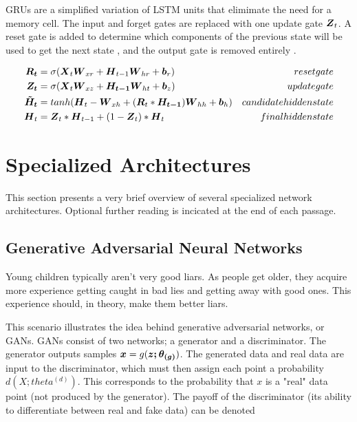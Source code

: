 \documentclass{article}
\begin{document}
GRUs are a simplified variation of LSTM units that elimimate the need for a memory cell. The input and forget gates are replaced with one update gate \(\vb*{Z}_t\). A reset gate is added to determine which components of the previous state will be used to get the next state \cite{hands-on-ml}, and the output gate is removed entirely \cite{pml1book}.

\begin{align*}
    \vb*{R_t} &= \sigma(\vb*{X}_t\vb*{W}_{xr} + \vb*{H}_{t-1}\vb*{W}_{hr} + \vb*{b}_r) & reset gate \\
    \vb*{Z_t} &= \sigma(\vb*{X}_t\vb*{W}_{xz} + \vb*{H_{t-1}}\vb*{W}_{ht} + \vb*{b}_z) & update gate \\
    \vb*{\tilde{H}_t} &= tanh(\vb*{H}_t - \vb*{W}_{xh} + (\vb*{R}_t * \vb*{H_{t-1}})\vb*{W}_{hh} + \vb*{b}_h) & candidate hidden state \\
    \vb*{H}_t &= \vb*{Z}_t * \vb*{H}_{t-1} + (1 - \vb*{Z}_t)*\vb*{H}_t & final hidden state \\
\end{align*}

\section{Specialized Architectures}

This section presents a very brief overview of several specialized network architectures. Optional further reading is incicated at the end of each passage.

\subsection{Generative Adversarial Neural Networks} %

Young children typically aren't very good liars. As people get older, they acquire more experience getting caught in bad lies and getting away with good ones. This experience should, in theory, make them better liars.

This scenario illustrates the idea behind generative adversarial networks, or GANs. GANs consist of two networks; a generator and a discriminator. The generator outputs samples \(\vb*{x} = g(\vb*{z; \theta_{(g)}})\). The generated data and real data are input to the discriminator, which must then assign each point a probability \(d(X; theta^{(d)})\). This corresponds to the probability that \(x\) is a "real" data point (not produced by the generator). The payoff of the discriminator \cite{Goodfellow-et-al-2016} (its ability to differentiate between real and fake data) can be denoted 
\end{document}
